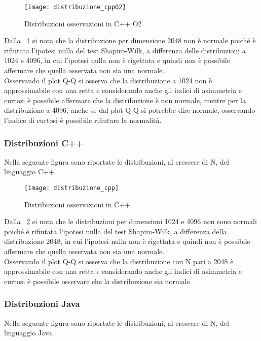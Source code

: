 \begin{figure}[!htbp]
  \texttt{[image: distribuzione\_cppO2]}
  \caption{Distribuzioni osservazioni in C++ O2}
  \label{prodottomatrici_distribuzione_cppO2}
\end{figure}
Dalla \figurename~\ref{prodottomatrici_distribuzione_cppO2} si nota
che la distribuzione per dimensione 2048 non è normale poiché è rifiutata
l'ipotesi nulla del test Shapiro-Wilk, a differenza delle distribuzioni a 1024 e 4096,
in cui l'ipotesi nulla non è rigettata e quindi non è possibile affermare che
quella osservata non sia una normale.\\
Osservando il plot Q-Q si osserva che la distribuzione a 1024 non è approssimabile con una
retta e considerando anche gli indici di asimmetria e curtosi è possibile affermare che
la distribuzione è non normale, mentre per la distribuzione a 4096, anche se dal plot
Q-Q si potrebbe dire normale, osservando l'indice di curtosi è possibile rifiutare
la normalità.
\clearpage
\subsubsection{Distribuzioni C++ }
Nella seguente figura sono riportate le distribuzioni, al crescere di N, del
linguaggio C++.

\begin{figure}[!htbp]
  \texttt{[image: distribuzione\_cpp]}
  \caption{Distribuzioni osservazioni in C++}
  \label{prodottomatrici_distribuzione_cpp}
\end{figure}

Dalla \figurename~\ref{prodottomatrici_distribuzione_cpp} si nota
che le distribuzioni per dimensioni 1024 e 4096 non sono normali poiché è rifiutata
l'ipotesi nulla del test Shapiro-Wilk, a differenza della distribuzione 2048,
in cui l'ipotesi nulla non è rigettata e quindi non è possibile affermare
che quella osservata non sia una normale.\\
Osservando il plot Q-Q si osserva che la distribuzione con N pari a 2048 è approssimabile con una
retta e considerando anche gli indici di asimmetria e curtosi è possibile osservare che
la distribuzione sia normale.\\
\clearpage
\subsubsection{Distribuzioni Java}
Nella seguente figura sono riportate le distribuzioni, al crescere di N, del
linguaggio Java.

